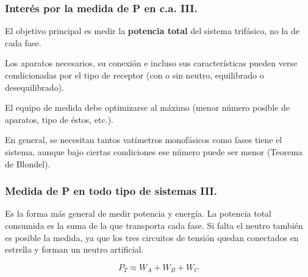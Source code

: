 		\subsubsection{Interés por la medida de P en c.a. III.}
			El objetivo principal es medir la \textbf{potencia total} del sistema trifásico, no la de cada fase.
			
			
			Los aparatos necesarios, su conexión e incluso sus características pueden verse condicionadas por el tipo de receptor (con o sin neutro, equilibrado o desequilibrado).
			
			
			El equipo de medida debe optimizarse al máximo (menor número posible de aparatos, tipo de éstos, etc.).
			
			
			En general, se necesitan tantos vatímetros monofásicos como fases tiene el sistema, aunque bajo ciertas condiciones ese número puede ser menor (Teorema de Blondel).
			
		\subsubsection{Medida de P en todo tipo de sistemas III.}
				Es la forma más general de medir potencia y energía. La potencia total consumida es la suma de la que transporta cada fase. Si falta el neutro también es posible la medida, ya que los tres circuitos de tensión quedan conectados en estrella y forman un neutro artificial.
				
				\[P_T \approx W_A + W_B + W_C\]
				
